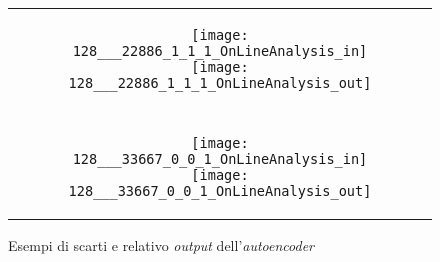 \begin{figure}[ht] %
  \begin{center}
    \begin{tabular}{c}
      \begin{subfigure}{\linewidth}
        \begin{center}
          \texttt{[image: 128\_\_\_22886\_1\_1\_1\_OnLineAnalysis\_in]}
          \texttt{[image: 128\_\_\_22886\_1\_1\_1\_OnLineAnalysis\_out]}
        \end{center}
      \end{subfigure} \\ \\

      \begin{subfigure}{\linewidth}
        \begin{center}
          \texttt{[image: 128\_\_\_33667\_0\_0\_1\_OnLineAnalysis\_in]}
          \texttt{[image: 128\_\_\_33667\_0\_0\_1\_OnLineAnalysis\_out]}
        \end{center}
      \end{subfigure}

    \end{tabular}
    \caption{Esempi di scarti e relativo \textit{output} dell'\textit{autoencoder}}
    \label{fig:scarti_in_out}
  \end{center}
\end{figure}


